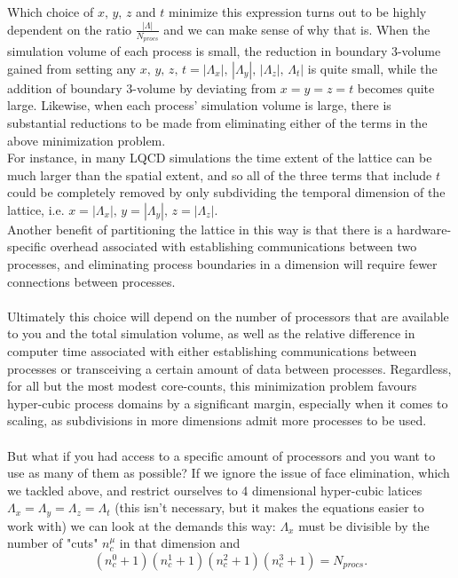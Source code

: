 \documentclass[a4paper,10pt]{article}
\begin{document}
Which choice of $x,\,y,\,z$ and $t$ minimize this expression turns out to be highly dependent on the ratio $\frac{|\Lambda|}{N_{procs}}$ and we can make sense of why that is. When the simulation volume of each process is small, the reduction in boundary 3-volume gained from setting any $x,\,y,\,z,\,t = |\Lambda_x|,\,|\Lambda_y|,\,|\Lambda_z|,\,\Lambda_t|$ is quite small, while the addition of boundary 3-volume by deviating from $x=y=z=t$ becomes quite large. Likewise, when each process' simulation volume is large, there is substantial reductions to be made from eliminating either of the terms in the above minimization problem.\\For instance, in many LQCD simulations the time extent of the lattice can be much larger than the spatial extent, and so all of the three terms that include $t$ could be completely removed by only subdividing the temporal dimension of the lattice, i.e. $x=|\Lambda_x|,\,y=|\Lambda_y|,\,z=|\Lambda_z|$.\\Another benefit of partitioning the lattice in this way is that there is a hardware-specific overhead associated with establishing communications between two processes, and eliminating process boundaries in a dimension will require fewer connections between processes.\\\\Ultimately this choice will depend on the number of processors that are available to you and the total simulation volume, as well as the relative difference in computer time associated with either establishing communications between processes or transceiving a certain amount of data between processes. Regardless, for all but the most modest core-counts, this minimization problem favours hyper-cubic process domains by a significant margin, especially when it comes to scaling, as subdivisions in more dimensions admit more processes to be used.\\\\But what if you had access to a specific amount of processors and you want to use as many of them as possible? If we ignore the issue of face elimination, which we tackled above, and restrict ourselves to 4 dimensional hyper-cubic latices $\Lambda_x=\Lambda_y=\Lambda_z=\Lambda_t$ (this isn't necessary, but it makes the equations easier to work with) we can look at the demands this way: $\Lambda_x$ must be divisible by the number of "cuts" $n^\mu_c$ in that dimension and 
\begin{equation}
(n^0_c+1)(n^1_c+1)(n^2_c+1)(n^3_c+1)= N_{procs}.
\end{equation}
\end{document}
